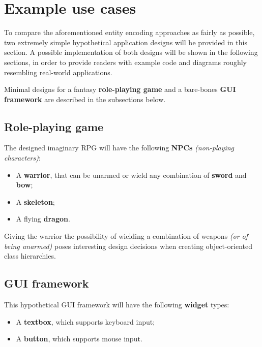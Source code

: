 \documentclass[twoside, 12pt, a4paper, openright]{book}
\begin{document}
\newpage

\section{Example use cases}\label{example-use-cases}

To compare the aforementioned entity encoding approaches as fairly as
possible, two extremely simple hypothetical application designs will be
provided in this section. A possible implementation of both designs will
be shown in the following sections, in order to provide readers with
example code and diagrams roughly resembling real-world applications.

Minimal designs for a fantasy \textbf{role-playing game} and a
bare-bones \textbf{GUI framework} are described in the subsections
below.

\subsection{Role-playing game}\label{role-playing-game}

The designed imaginary RPG will have the following \textbf{NPCs}
\emph{(non-playing characters)}:

\begin{itemize}
\item
  A \textbf{warrior}, that can be unarmed or wield any combination of
  \textbf{sword} and \textbf{bow};
\item
  A \textbf{skeleton};
\item
  A flying \textbf{dragon}.
\end{itemize}

Giving the warrior the possibility of wielding a combination of weapons
\emph{(or of being unarmed)} poses interesting design decisions when
creating object-oriented class hierarchies.

\subsection{GUI framework}\label{gui-framework}

This hypothetical GUI framework will have the following \textbf{widget}
types:

\begin{itemize}
\item
  A \textbf{textbox}, which supports keyboard input;
\item
  A \textbf{button}, which supports mouse input.
\end{itemize}
\end{document}
